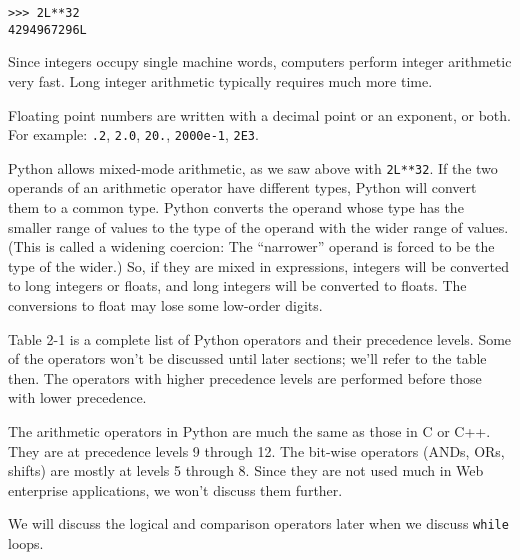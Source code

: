 \begin{verbatim}
>>> 2L**32
4294967296L
\end{verbatim}


Since integers occupy single
machine words, computers perform integer arithmetic very fast. Long
integer arithmetic typically requires much more time.

Floating point numbers are written
with a decimal point or an exponent, or both. For example: \texttt{.2},
\texttt{2.0}, \texttt{20.}, \texttt{2000e-1}, \texttt{2E3}.

Python allows mixed-mode
arithmetic, as we saw above with \texttt{2L**32}. If the two operands of
an arithmetic operator have different types, Python will convert them to
a common type. Python converts the operand whose type has the smaller
range of values to the type of the operand with the wider range of
values. (This is called a widening coercion: The ``narrower'' operand is
forced to be the type of the wider.) So, if they are mixed in
expressions, integers will be converted to long integers or floats, and
long integers will be converted to floats. The conversions to float may
lose some low-order digits.


Table 2-1 is a complete list of
Python operators and their precedence levels. Some of the operators
won't be discussed until later sections; we'll refer to the table then.
The operators with higher precedence levels are performed before those
with lower precedence.

The arithmetic operators in Python
are much the same as those in C or C++. They are at precedence levels 9
through 12. The bit-wise operators (ANDs, ORs, shifts) are mostly at
levels 5 through 8. Since they are not used much in Web enterprise
applications, we won't discuss them further.

We will discuss the logical and
comparison operators later when we discuss \texttt{while} loops.

